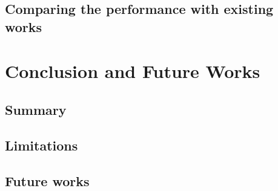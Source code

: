 \documentclass[letterpaper,12pt,titlepage,oneside,final]{book}
\begin{document}
\section{Comparing the performance with existing works}

\chapter{Conclusion and Future Works}

\section{Summary}

\section{Limitations}

\section{Future works}


\appendix
\end{document}
